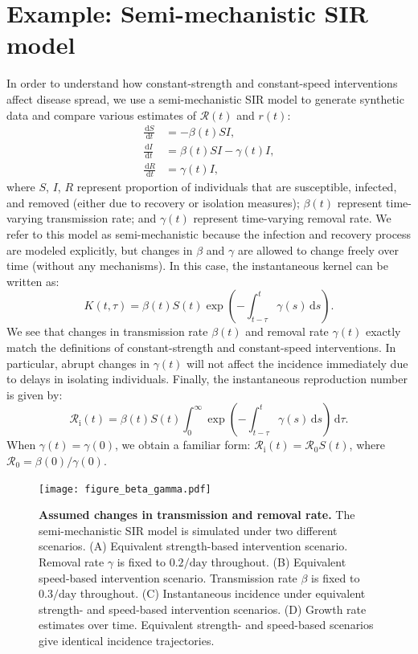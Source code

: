 \documentclass[12pt]{article}
\newcommand{\pday}{\ensuremath{/\textrm{day}}}
\newcommand{\Rx}[1]{\ensuremath{{\mathcal R}_{#1}}\xspace}
\newcommand{\Ro}{\Rx{0}}
\newcommand{\Ri}{\Rx{\mathrm{i}}}
\newcommand{\RR}{\ensuremath{{\mathcal R}}\xspace}
\newcommand{\dd}[1]{\ensuremath{\, \mathrm{d}#1}}
\newcommand{\dtau}{\dd{\tau}}
\begin{document}
\section{Example: Semi-mechanistic SIR model}

In order to understand how constant-strength and constant-speed interventions affect disease spread, we use a semi-mechanistic SIR model to generate synthetic data and compare various estimates of $\RR(t)$ and $r(t)$:
\begin{align}
\frac{\dd{S}}{\dd{t}} &= - \beta(t)S I, \label{eq:dSdt}\\
\frac{\dd{I}}{\dd{t}} &= \beta(t)S I - \gamma(t) I,\\
\frac{\dd{R}}{\dd{t}} &= \gamma(t) I,  \label{eq:dRdt}
\end{align}
where $S$, $I$, $R$ represent proportion of individuals that are susceptible, infected, and removed (either due to recovery or isolation measures);
$\beta(t)$ represent time-varying transmission rate; and $\gamma(t)$ represent time-varying removal rate.
We refer to this model as semi-mechanistic because the infection and recovery process are modeled explicitly, but changes in $\beta$ and $\gamma$ are allowed to change freely over time (without any mechanisms).
In this case, the instantaneous kernel can be written as:
\begin{equation}
K(t, \tau) = \beta(t) S(t) \exp\left(-\int_{t-\tau}^t \gamma(s) \dd{s} \right).
\end{equation}
We see that changes in transmission rate $\beta(t)$ and removal rate $\gamma(t)$ exactly match the definitions of constant-strength and constant-speed interventions.
In particular, abrupt changes in $\gamma(t)$ will not affect the incidence immediately due to delays in isolating individuals.
Finally, the instantaneous reproduction number is given by:
\begin{equation}
\Ri(t) = \beta(t) S(t) \int_0^\infty \exp\left(-\int_{t-\tau}^t \gamma(s) \dd{s} \right) \dtau.
\end{equation}
When $\gamma(t) = \gamma(0)$, we obtain a familiar form: $\Ri(t) = \Ro S(t)$,
where $\Ro = \beta(0)/\gamma(0)$.

\begin{figure}[!ht]
\texttt{[image: figure\_beta\_gamma.pdf]}
\caption{
\textbf{Assumed changes in transmission and removal rate.}
The semi-mechanistic SIR model is simulated under two different scenarios.
(A) Equivalent strength-based intervention scenario.
Removal rate $\gamma$ is fixed to $0.2\pday$ throughout.
(B) Equivalent speed-based intervention scenario.
Transmission rate $\beta$ is fixed to $0.3\pday$ throughout.
(C) Instantaneous incidence under equivalent strength- and speed-based intervention scenarios.
(D) Growth rate estimates over time.
Equivalent strength- and speed-based scenarios give identical incidence trajectories.
}
\label{fig:assumption}
\end{figure}
\end{document}
